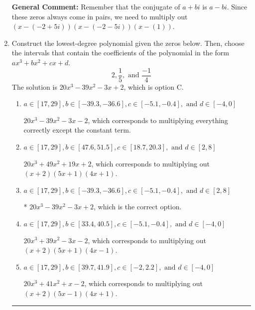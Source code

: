\documentclass{extbook}[14pt]
\newcommand{\litem}[1]{\item #1

\rule{\textwidth}{0.4pt}}
\begin{document}
\begin{enumerate}
{\textbf{General Comment:} Remember that the conjugate of $a+bi$ is $a-bi$. Since these zeros always come in pairs, we need to multiply out $(x-(-2 + 5 i))(x-(-2 - 5 i))(x-(1))$.
}
\litem{
Construct the lowest-degree polynomial given the zeros below. Then, choose the intervals that contain the coefficients of the polynomial in the form $ax^3+bx^2+cx+d$.
\[ 2, \frac{1}{5}, \text{ and } \frac{-1}{4} \]The solution is \( 20x^{3} -39 x^{2} -3 x + 2 \), which is option C.\begin{enumerate}[label=\Alph*.]
\item \( a \in [17, 29], b \in [-39.3, -36.6], c \in [-5.1, -0.4], \text{ and } d \in [-4, 0] \)

$20x^{3} -39 x^{2} -3 x -2$, which corresponds to multiplying everything correctly except the constant term.
\item \( a \in [17, 29], b \in [47.6, 51.5], c \in [18.7, 20.3], \text{ and } d \in [2, 8] \)

$20x^{3} +49 x^{2} +19 x + 2$, which corresponds to multiplying out $(x + 2)(5x + 1)(4x + 1)$.
\item \( a \in [17, 29], b \in [-39.3, -36.6], c \in [-5.1, -0.4], \text{ and } d \in [2, 8] \)

* $20x^{3} -39 x^{2} -3 x + 2$, which is the correct option.
\item \( a \in [17, 29], b \in [33.4, 40.5], c \in [-5.1, -0.4], \text{ and } d \in [-4, 0] \)

$20x^{3} +39 x^{2} -3 x -2$, which corresponds to multiplying out $(x + 2)(5x + 1)(4x -1)$.
\item \( a \in [17, 29], b \in [39.7, 41.9], c \in [-2, 2.2], \text{ and } d \in [-4, 0] \)

$20x^{3} +41 x^{2} +x -2$, which corresponds to multiplying out $(x + 2)(5x -1)(4x + 1)$.
\end{enumerate}

}
\end{enumerate}
\end{document}
